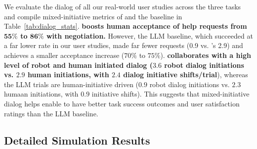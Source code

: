 \begin{table}[h]
\caption{Mixed-Initiative Dialog Metrics}
\label{tab:mixed-init-dialog-metrics}
\centering
{} %
\label{tab:dialog_stats}
\end{table}

We evaluate the dialog of all our real-world user studies across the three tasks and compile mixed-initiative metrics of \ours{} and the baseline in Table~\ref{tab:dialog_stats}.
\textbf{\ours{} boosts human acceptance of help requests from $\mathbf{55\%}$ to $\mathbf{86\%}$ with negotiation.} However, the LLM baseline, which succeeded at a far lower rate in our user studies, made far fewer requests (0.9 vs. \ours{}'s 2.9) and achieves a smaller acceptance increase ($70\%$ to $75\%$). \textbf{\ours{} collaborates with a high level of robot and human initiated dialog ($\mathbf{3.6}$ robot dialog initiations vs. $\mathbf{2.9}$ human initiations, with $\mathbf{2.4}$ dialog initiative shifts/trial}), whereas the LLM trials are human-initiative driven ($0.9$ robot dialog initiations vs. $2.3$ humaan initiations, with $0.9$ initiative shifts). This suggests that mixed-initiative dialog helps enable \ours{} to have better task success outcomes and user satisfaction ratings than the LLM baseline.

\subsection{Detailed Simulation Results}
\label{app:ours-sim-results}
